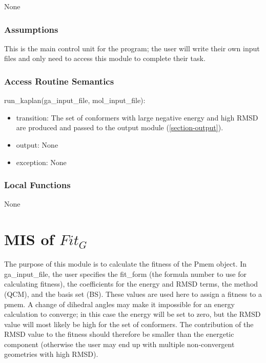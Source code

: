 \documentclass[12pt, titlepage]{article}
\begin{document}
None

\subsubsection{Assumptions}

This is the main control unit for the program; the user will write their own 
input files and only need to access this module to complete their task.

\subsubsection{Access Routine Semantics}

\noindent run\_kaplan(ga\_input\_file, mol\_input\_file):
\begin{itemize}
	\item transition: The set of conformers with large negative energy and high 
	RMSD are produced and passed to the 
	output module (\ref{section-output}).
	\item output: None
	\item exception: None
\end{itemize}

\subsubsection{Local Functions}

None

\section{MIS of $Fit_G$} \label{section-fitg}

The purpose of this module is to calculate the fitness of the Pmem object. In 
ga\_input\_file, the user specifies the fit\_form (the formula number to use 
for calculating fitness), the coefficients for the energy and RMSD terms, the 
method (QCM), and the basis set (BS). These values are used here to assign a 
fitness to a pmem. A change of dihedral angles may make it impossible for an 
energy calculation to converge; in this case the energy will be set to zero, 
but the RMSD value will most likely be high for the set of conformers. The 
contribution of the RMSD value to the fitness should therefore be smaller than 
the energetic component (otherwise the user may end up with multiple 
non-convergent geometries with high RMSD).
\end{document}
